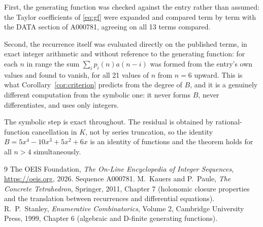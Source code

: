 \documentclass[11pt,a4paper]{article}
\theoremstyle{plain}
\theoremstyle{definition}
\begin{document}
First, the generating function was checked against the entry rather than assumed: the
Taylor coefficients of \eqref{eq:gf} were expanded and compared term by term with the DATA
section of A000781, agreeing on all 13 terms compared.

Second, the recurrence itself was evaluated directly on the published terms, in exact
integer arithmetic and without reference to the generating function: for each $n$ in range
the sum $\sum_{i}p_{i}(n)a(n-i)$ was formed from the entry's own values and found to
vanish, for all 21 values of $n$ from $n=6$ upward. This is what
Corollary~\ref{cor:criterion} predicts from the degree of $B$, and it is a genuinely
different computation from the symbolic one: it never forms $B$, never differentiates, and
uses only integers.

The symbolic step is exact throughout. The residual is obtained by rational-function
cancellation in $K$, not by series truncation, so the identity $B=5 x^{4} - 10 x^{3} + 5 x^{2} + 6 x$ is an
identity of functions and the theorem holds for all $n>4$ simultaneously.

\begin{thebibliography}{9}
 The OEIS Foundation, \emph{The On-Line Encyclopedia of Integer Sequences},
\url{https://oeis.org}, 2026. Sequence A000781.
 M.~Kauers and P.~Paule, \emph{The Concrete Tetrahedron}, Springer, 2011,
Chapter 7 (holonomic closure properties and the translation between recurrences and
differential equations).
 R.~P.~Stanley, \emph{Enumerative Combinatorics}, Volume 2, Cambridge
University Press, 1999, Chapter 6 (algebraic and D-finite generating functions).
\end{thebibliography}
\end{document}
